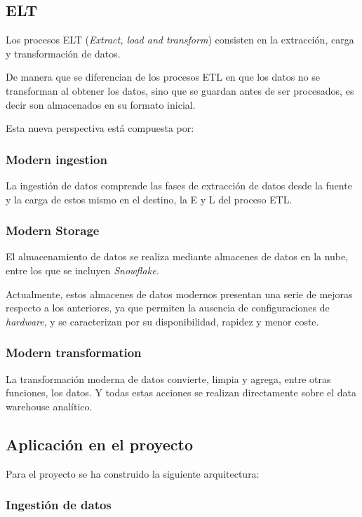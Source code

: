 \subsection{ELT}
Los procesos ELT (\emph{Extract, load and transform}) \cite{ELT} consisten en la extracción, carga y transformación de datos. 

De manera que se diferencian de los procesos ETL en que los datos no se transforman al obtener los datos, sino que se guardan antes de ser procesados, es decir son almacenados en su formato inicial.

Esta nueva perspectiva está compuesta por:

\subsubsection{Modern ingestion}
La ingestión de datos \cite{Modern} comprende las fases de extracción de datos desde la fuente y la carga de estos mismo en el destino, la E y L del proceso ETL.

\subsubsection{Modern Storage}
El almacenamiento de datos \cite{Modern} se realiza mediante almacenes de datos en la nube, entre los que se incluyen \emph{Snowflake}.

Actualmente, estos almacenes de datos modernos presentan una serie de mejoras respecto a los anteriores, ya que permiten la ausencia de configuraciones de \emph{hardware}, y se caracterizan por su disponibilidad, rapidez y menor coste.

\subsubsection{Modern transformation}
La transformación moderna de datos \cite{Modern} convierte, limpia y agrega, entre otras funciones, los datos. Y todas estas acciones se realizan directamente sobre el data warehouse analítico.


\subsection{Aplicación en el proyecto}

Para el proyecto se ha construido la siguiente arquitectura:

\subsubsection{Ingestión de datos}

